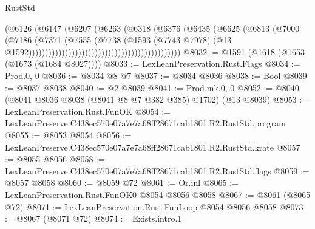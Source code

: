 \begin{lexlean}{RustStd}
\begin{coremodule}
                                                                (@6126
                                                                  (@6147
                                                                    (@6207
                                                                      (@6263
                                                                        (@6318
                                                                          (@6376
                                                                            (@6435
                                                                              (@6625
                                                                                (@6813
                                                                                  (@7000
                                                                                    (@7186
                                                                                      (@7371
                                                                                        (@7555
                                                                                          (@7738
                                                                                            (@1593
                                                                                              (@7743
                                                                                                @7978)
                                                                                              (@13
                                                                                                @1592))))))))))))))))))))))))))))))))))))))))))))))
@8032 := @1591 (@1618 (@1653 (@1673 (@1684 @8027))))
@8033 := LexLeanPreservation.Rust.Flags
@8034 := Prod.{0, 0}
@8036 := @8034 @8 @7
@8037 := @8034 @8036
@8038 := Bool
@8039 := @8037 @8038
@8040 := @2 @8039
@8041 := Prod.mk.{0, 0}
@8052 := @8040 (@8041 @8036 @8038 (@8041 @8 @7 @382 @385) @1702) (@13 @8039)
@8053 := LexLeanPreservation.Rust.FunOK
@8054 := LexLeanPreserve.C438ec570e07a7e7a68ff28671cab1801.R2.RustStd.program
@8055 := @8053 @8054
@8056 := LexLeanPreserve.C438ec570e07a7e7a68ff28671cab1801.R2.RustStd.krate
@8057 := @8055 @8056
@8058 := LexLeanPreserve.C438ec570e07a7e7a68ff28671cab1801.R2.RustStd.flags
@8059 := @8057 @8058
@8060 := @8059 @72
@8061 := Or.inl
@8065 := LexLeanPreservation.Rust.FunOK0 @8054 @8056 @8058
@8067 := @8061 (@8065 @72)
@8071 := LexLeanPreservation.Rust.FunLoop @8054 @8056 @8058
@8073 := @8067 (@8071 @72)
@8074 := Exists.intro.{1}

\end{coremodule}
\end{lexlean}
